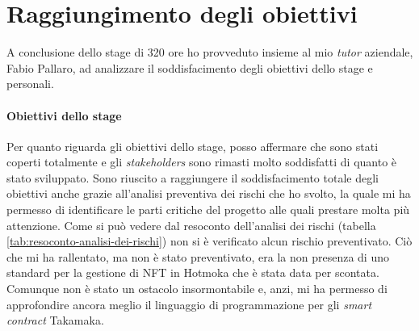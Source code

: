 
\section{Raggiungimento degli obiettivi}
A conclusione dello stage di 320 ore ho provveduto insieme al mio \textit{tutor} aziendale, Fabio Pallaro, ad analizzare il soddisfacimento degli obiettivi dello stage e personali.

\paragraph{Obiettivi dello stage}
Per quanto riguarda gli obiettivi dello stage, posso affermare che sono stati coperti totalmente e gli \textit{stakeholders} sono rimasti molto soddisfatti di quanto è stato sviluppato. 
Sono riuscito a raggiungere il soddisfacimento totale degli obiettivi anche grazie all'analisi preventiva dei rischi che ho svolto, la quale mi ha permesso di identificare le parti critiche del progetto alle quali prestare molta più attenzione. 
Come si può vedere dal resoconto dell'analisi dei rischi (tabella \ref{tab:resoconto-analisi-dei-rischi}) non si è verificato alcun rischio preventivato. 
Ciò che mi ha rallentato, ma non è stato preventivato, era la non presenza di uno standard per la gestione di NFT in Hotmoka che è stata data per scontata. Comunque non è stato un ostacolo insormontabile e, anzi, mi ha permesso di approfondire ancora meglio il linguaggio di programmazione per gli \textit{smart contract} Takamaka.

